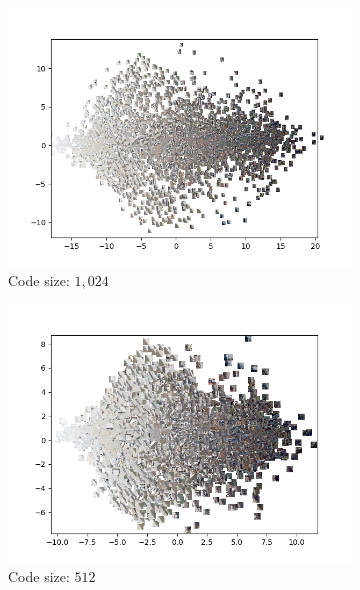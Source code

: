 \begin{figure}[H]
    \centering
    \begin{subfigure}{.5\textwidth}
        \centering
        \includegraphics[width=\textwidth]{images/figures/experiments_latent/convolutional_dim1024_PCA_images.png}
        \caption{Code size: $1,024$}
    \end{subfigure}%
    \begin{subfigure}{.5\textwidth}
        \centering
        \includegraphics[width=\textwidth]{images/figures/experiments_latent/convolutional_dim512_PCA_images.png}
        \caption{Code size: $512$}
    \end{subfigure}
    \begin{subfigure}{.5\textwidth}

\end{subfigure}
\end{figure}
